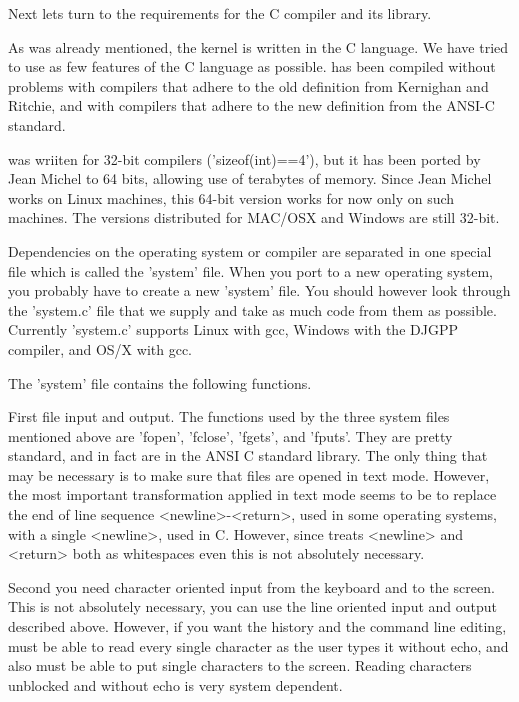 Next lets turn to the requirements for the C compiler and its library.

As was already mentioned, the {\GAP} kernel is written in the C language.
We  have tried  to use  as few features  of  the C language as  possible.
{\GAP} has  been compiled without  problems with compilers that adhere to
the old  definition from Kernighan and Ritchie,  and with  compilers that
adhere to the new definition from the ANSI-C standard.

{\GAP} was wriiten for 32-bit compilers ('sizeof(int)==4'), but it has been
ported  by Jean  Michel to  64 bits,  allowing use  of terabytes of memory.
Since  Jean Michel works  on Linux machines,  this 64-bit version works for
now only on such machines. The versions distributed for MAC/OSX and Windows
are still 32-bit.

Dependencies  on  the  operating  system  or  compiler are separated in one
special  file which is called the 'system'  file. When you port {\GAP} to a
new  operating system, you probably have to create a new 'system' file. You
should  however look through the 'system.c' file that we supply and take as
much  code from them as possible.  Currently 'system.c' supports Linux with
gcc, Windows with the DJGPP compiler, and OS/X with gcc.

The 'system' file contains the following functions.

First  file  input and output.  The   functions used by  the three system
files mentioned above are 'fopen', 'fclose',  'fgets', and 'fputs'.  They
are pretty standard, and in fact are in the ANSI C standard library.  The
only thing that may be necessary is to make sure that files are opened in
text  mode.  However, the most  important transformation  applied in text
mode seems to be to replace  the end of line sequence <newline>-<return>,
used in some  operating  systems, with a  single  <newline>, used  in  C.
However, since  {\GAP} treats <newline> and  <return> both as whitespaces
even this is not absolutely necessary.

Second you need  character oriented input  from the keyboard   and to the
screen.  This is not absolutely necessary, you can  use the line oriented
input and output described above.  However, if  you want the  history and
the command  line editing, {\GAP}  must  be  able   to read every  single
character as the user types it without echo, and also must be able to put
single characters  to  the screen.    Reading  characters  unblocked  and
without echo is very  system dependent.

